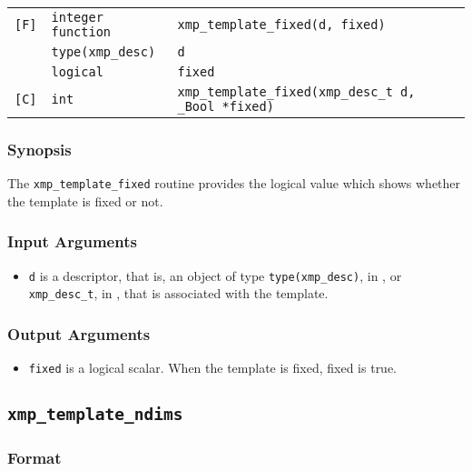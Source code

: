 \begin{tabular}{lll}

\verb![F]!& {\tt integer function}& {\tt xmp\_template\_fixed(d, fixed)}\\
          & {\tt type(xmp\_desc)} & {\tt d}\\
          & {\tt logical} & {\tt fixed}\\

\verb![C]!&  {\tt int}& {\tt xmp\_template\_fixed(xmp\_desc\_t d, \_Bool *fixed)}\\

\end{tabular}

\subsubsection*{Synopsis}

The {\tt xmp\_template\_fixed} routine provides the logical value which shows whether the template is fixed or not. 


\subsubsection*{Input Arguments}
\begin{itemize}
 \item {\tt d} is a descriptor, that is, an object of type 
       {\tt type(xmp\_desc)}, in {\XMPF}, or {\tt xmp\_desc\_t},
       in {\XMPC}, that is associated with the template.
\end{itemize}

\subsubsection*{Output Arguments}
\begin{itemize}
 \item {\tt fixed} is a logical scalar. When the template is fixed, fixed is true.
\end{itemize}

\subsection{\tt xmp\_template\_ndims}

\subsubsection*{Format}

